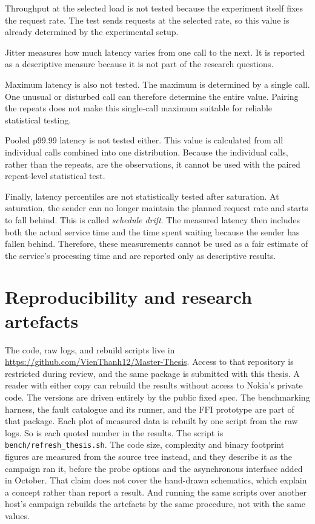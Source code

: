 \documentclass[english,oneside,a4paper,censored,csm,software-track-2020]{HYthesisML}
\begin{document}
Throughput at the selected load is not tested because the experiment itself fixes
the request rate. The test sends requests at the selected rate, so this value is
already determined by the experimental setup.

Jitter measures how much latency varies from one call to the next. It is reported
as a descriptive measure because it is not part of the research questions.

Maximum latency is also not tested. The maximum is determined by a single call. One
unusual or disturbed call can therefore determine the entire value. Pairing the
repeats does not make this single-call maximum suitable for reliable statistical
testing.

Pooled p99.99 latency is not tested either. This value is calculated from all
individual calls combined into one distribution. Because the individual calls,
rather than the repeats, are the observations, it cannot be used with the paired
repeat-level statistical test.

Finally, latency percentiles are not statistically tested after saturation. At
saturation, the sender can no longer maintain the planned request rate and starts
to fall behind. This is called \emph{schedule drift}. The measured latency then
includes both the actual service time and the time spent waiting because the sender
has fallen behind. Therefore, these measurements cannot be used as a fair estimate
of the service's processing time and are reported only as descriptive results.

\section{Reproducibility and research artefacts}\label{sec:repro}
The code, raw logs, and rebuild scripts live in
\url{https://github.com/VienThanh12/Master-Thesis}. Access to that repository is
restricted during review, and the same package is submitted with this thesis.
A reader with either copy can rebuild the results without access to Nokia's
private code. The versions are driven entirely by the public fixed spec. The
benchmarking harness, the fault catalogue and its runner, and the FFI
prototype are part of that package. Each plot of measured data is rebuilt by
one script from the raw logs. So is each quoted number in the results. The
script is \texttt{bench/refresh\_thesis.sh}. The code size, complexity and binary
footprint figures are measured from the source tree instead, and they describe it as
the campaign ran it, before the probe options and the asynchronous interface added in
October. That claim does not cover the
hand-drawn schematics, which explain a concept rather than report a result.
And running the same scripts over another host's campaign rebuilds the
artefacts by the same procedure, not with the same values.
\end{document}
